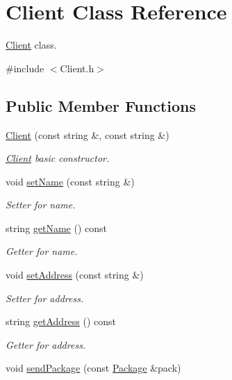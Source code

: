 \hypertarget{classClient}{}\section{Client Class Reference}
\label{classClient}


\hyperlink{classClient}{Client} class.  




{\ttfamily \#include $<$Client.\+h$>$}

\subsection*{Public Member Functions}
\begin{DoxyCompactItemize}
\item 
\hyperlink{classClient_a48f1cf82b72f664d7cc64a4f3022f5eb}{Client} (const string \&, const string \&)
\begin{DoxyCompactList}\small\item\em \hyperlink{classClient}{Client} basic constructor. \end{DoxyCompactList}\item 
void \hyperlink{classClient_ab78b7ecbedb2d6fc0e0df3dfa8c973bc}{set\+Name} (const string \&)
\begin{DoxyCompactList}\small\item\em Setter for name. \end{DoxyCompactList}\item 
string \hyperlink{classClient_a28a677584ad4793b50b31c2e75039e2c}{get\+Name} () const 
\begin{DoxyCompactList}\small\item\em Getter for name. \end{DoxyCompactList}\item 
void \hyperlink{classClient_a8a035b3e170849283f8b130965c5fa75}{set\+Address} (const string \&)
\begin{DoxyCompactList}\small\item\em Setter for address. \end{DoxyCompactList}\item 
string \hyperlink{classClient_a291fb22c4fccb2a6b182c355078553ed}{get\+Address} () const 
\begin{DoxyCompactList}\small\item\em Getter for address. \end{DoxyCompactList}\item 
void \hyperlink{classClient_a7c2013e38135e9b9c4f0562e6e4393b9}{send\+Package} (const \hyperlink{classPackage}{Package} \&pack)

\end{DoxyCompactItemize}
